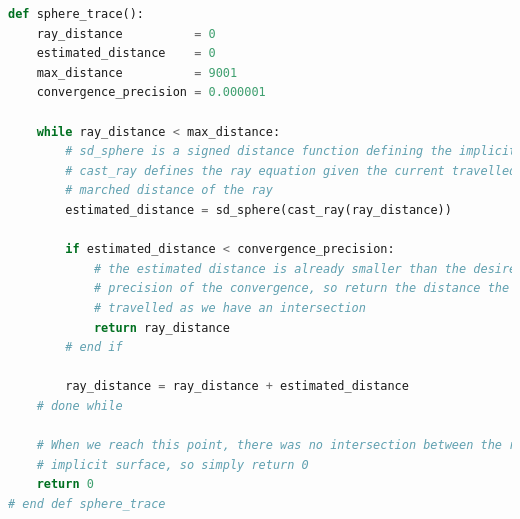 \begin{minipage}{\linewidth}
\begin{lstlisting}[language=Python,caption={Eine abstrakte Umsetzung des Sphere
        Tracings\protect\footnotemark.},label={alg:sphere_tracing},captionpos=b,emph={sphere_trace}]
def sphere_trace():
    ray_distance          = 0
    estimated_distance    = 0
    max_distance          = 9001
    convergence_precision = 0.000001

    while ray_distance < max_distance:
        # sd_sphere is a signed distance function defining the implicit surface
        # cast_ray defines the ray equation given the current travelled /
        # marched distance of the ray
        estimated_distance = sd_sphere(cast_ray(ray_distance))

        if estimated_distance < convergence_precision:
            # the estimated distance is already smaller than the desired
            # precision of the convergence, so return the distance the ray has
            # travelled as we have an intersection
            return ray_distance
        # end if

        ray_distance = ray_distance + estimated_distance
    # done while

    # When we reach this point, there was no intersection between the ray and a
    # implicit surface, so simply return 0
    return 0
# end def sphere_trace
\end{lstlisting}
\end{minipage}
